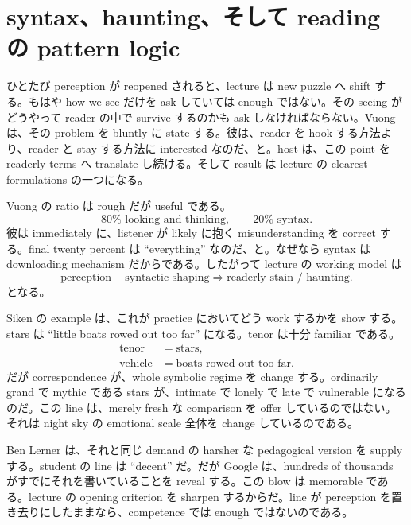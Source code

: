 \section{syntax、haunting、そして reading の pattern logic}

ひとたび perception が reopened されると、lecture は new puzzle へ shift する。もはや how we see だけを ask していては enough ではない。その seeing がどうやって reader の中で survive するのかも ask しなければならない。Vuong は、その problem を bluntly に state する。彼は、reader を hook する方法より、reader と stay する方法に interested なのだ、と。host は、この point を readerly terms へ translate し続ける。そして result は lecture の clearest formulations の一つになる。

Vuong の ratio は rough だが useful である。
\begin{equation}
80\% \text{ looking and thinking}, \qquad 20\% \text{ syntax}.
\end{equation}
彼は immediately に、listener が likely に抱く misunderstanding を correct する。final twenty percent は ``everything'' なのだ、と。なぜなら syntax は downloading mechanism だからである。したがって lecture の working model は
\begin{equation}
\text{perception} + \text{syntactic shaping} \Longrightarrow \text{readerly stain / haunting}.
\end{equation}
となる。

Siken の example は、これが practice においてどう work するかを show する。stars は ``little boats rowed out too far'' になる。tenor は十分 familiar である。
\begin{align}
\text{tenor} &= \text{stars},\\
\text{vehicle} &= \text{boats rowed out too far}.
\end{align}
だが correspondence が、whole symbolic regime を change する。ordinarily grand で mythic である stars が、intimate で lonely で late で vulnerable になるのだ。この line は、merely fresh な comparison を offer しているのではない。それは night sky の emotional scale 全体を change しているのである。

Ben Lerner は、それと同じ demand の harsher な pedagogical version を supply する。student の line は ``decent'' だ。だが Google は、hundreds of thousands がすでにそれを書いていることを reveal する。この blow は memorable である。lecture の opening criterion を sharpen するからだ。line が perception を置き去りにしたままなら、competence では enough ではないのである。

